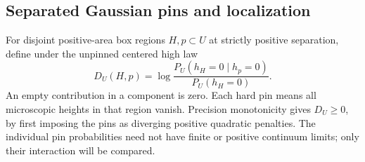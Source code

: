 \subsection{Separated Gaussian pins and localization}

For disjoint positive-area box regions $H,p\subset U$ at
strictly positive separation, define under the unpinned
centered high law
\begin{equation}
 D_U(H,p)=\log\frac{P_U(h_H=0\mid h_p=0)}{P_U(h_H=0)}.
 \label{an:pin-interaction-definition}
\end{equation}
An empty contribution in a component is zero.  Each hard
pin means all microscopic heights in that region vanish.
Precision monotonicity gives $D_U\ge0$, by first imposing
the pins as diverging positive quadratic penalties.  The
individual pin probabilities need not have finite or
positive continuum limits; only their interaction will
be compared.

